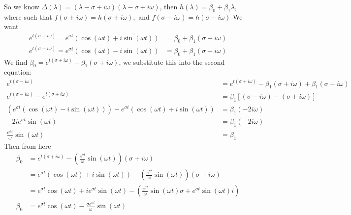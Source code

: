 \documentclass[11pt]{article}
\begin{document}
So we know $\Delta(\lambda) = (\lambda - \sigma + i \omega)(\lambda - \sigma + i \omega)$,
then $h(\lambda) = \beta_0 + \beta_1 \lambda$,
where such that $f(\sigma + i\omega) = h(\sigma + i\omega),$ and $f(\sigma - i\omega) = h(\sigma - i\omega)$
We want 
\begin{align*}
    e^{t(\sigma + i \omega)} = e^{\sigma t} (\cos(\omega t) + i \sin(\omega t)) &= \beta_0 + \beta_1 (\sigma + i \omega) \\
    e^{t(\sigma - i \omega)} = e^{\sigma t} (\cos(\omega t) - i \sin(\omega t)) &= \beta_0 + \beta_1 (\sigma - i \omega)
\end{align*}
We find $\beta_0 = e^{t(\sigma + i \omega)} - \beta_1(\sigma + i\omega)$,
we substitute this into the second equation:
\begin{align*}
    e^{t(\sigma - i \omega)} &= e^{t(\sigma + i \omega)} - \beta_1(\sigma + i\omega) + \beta_1 (\sigma - i \omega) \\
    e^{t(\sigma - i \omega)} - e^{t(\sigma + i \omega)} &= \beta_1 [(\sigma - i \omega) - (\sigma + i\omega) ]\\
    (e^{\sigma t} (\cos(\omega t) - i \sin(\omega t))) - e^{\sigma t}(\cos(\omega t) + i \sin(\omega t)) &= \beta_1 (-2i \omega)\\
    -2i e^{\sigma t} \sin(\omega t) &= \beta_1 (-2i \omega)\\
    \frac{e^{\sigma t}}{\omega} \sin(\omega t) &= \beta_1
\end{align*}
Then from here
\begin{align*}
    \beta_0 &= e^{t(\sigma + i \omega)} - (\frac{e^{\sigma t}}{\omega} \sin(\omega t))(\sigma + i\omega)\\
    &= e^{\sigma t} (\cos(\omega t) + i \sin(\omega t)) - (\frac{e^{\sigma t}}{\omega} \sin(\omega t))(\sigma + i\omega)\\
    &=  e^{\sigma t} \cos(\omega t) + i e^{\sigma t} \sin(\omega t) - (\frac{e^{\sigma t}}{\omega} \sin(\omega t) \sigma + e^{\sigma t} \sin(\omega t) i)\\
    \beta_0 &=  e^{\sigma t} \cos(\omega t) - \frac{\sigma e^{\sigma t}}{\omega} \sin(\omega t)
\end{align*}
\end{document}
